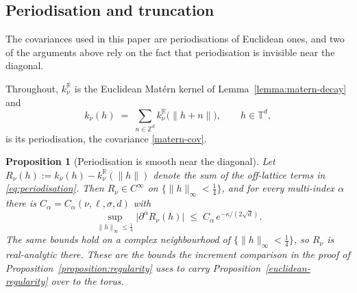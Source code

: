 \documentclass[pdflatex,sn-mathphys,Numbered]{sn-jnl}
\theoremstyle{thmstyleone}%
\newtheorem{proposition}[theorem]{Proposition}%
\theoremstyle{thmstyletwo}%
\theoremstyle{thmstylethree}%
\newcommand{\RR}{\mathbb{R}}
\newcommand{\ZZ}{\mathbb{Z}}
\newcommand{\TT}{\mathbb{T}}
\begin{document}
\begin{appendices}
\subsection{Periodisation and truncation}
\label{subsec:periodisation}

The covariances used in this paper are periodisations of Euclidean ones, and two
of the arguments above rely on the fact that periodisation is invisible near the
diagonal.

Throughout, $k^{\RR}_\nu$ is the Euclidean Mat\'ern kernel of
Lemma~\ref{lemma:matern-decay} and
\begin{equation}\label{eq:periodisation}
    k_\nu(h) \;=\; \sum_{n \in \ZZ^d} k^{\RR}_\nu\bigl(\|h+n\|\bigr),
    \qquad h \in \TT^d ,
\end{equation}
is its periodisation, the covariance \eqref{matern-cov}.

\begin{proposition}[Periodisation is smooth near the diagonal]
\label{prop:periodisation}
Let $R_\nu(h) := k_\nu(h) - k^{\RR}_\nu(\|h\|)$ denote the sum of the
off-lattice terms in \eqref{eq:periodisation}. Then $R_\nu \in C^\infty$ on
$\{\|h\|_\infty < \tfrac14\}$, and for every multi-index $\alpha$ there is
$C_\alpha = C_\alpha(\nu,\ell,\sigma,d)$ with
\[
    \sup_{\|h\|_\infty \leq \tfrac14}\bigl|\partial^\alpha R_\nu(h)\bigr|
    \;\leq\; C_\alpha \, e^{-\kappa/(2\sqrt d)} .
\]
The same bounds hold on a complex neighbourhood of $\{\|h\|_\infty<\tfrac14\}$,
so $R_\nu$ is real-analytic there. These are the bounds the increment comparison
in the proof of Proposition~\ref{proposition:regularity} uses to carry
Proposition~\ref{euclidean-regularity} over to the torus.
\end{proposition}


\end{appendices}
\end{document}
